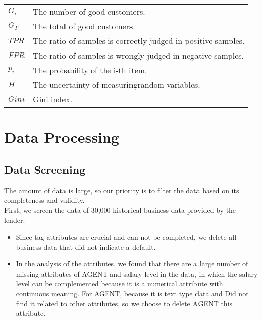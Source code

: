 \documentclass{mcmthesis}
\begin{document}
\begin{table}[htb]
\begin{tabular}{ll}
$G_i$ & The number of good customers. \\

$G_T$ & The total  of good customers. \\

$TPR$ & The ratio of samples is correctly judged in positive samples.\\

$FPR$ & The ratio of samples is wrongly judged in negative samples.\\

$p_i$ & The probability of the i-th item.\\

$H$ & The uncertainty of measuringrandom variables.\\

$Gini$ & Gini index. \\
\bottomrule
\end{tabular}
\end{table}

\section{Data Processing}
\subsection{Data Screening}
The amount of data is large, so our priority is to filter the data based on its completeness and validity.\\

First, we screen the data of 30,000 historical business data provided by the lender:\\
\begin{itemize}
\item Since tag attributes are crucial and can not be completed, we delete all business data that did not indicate a default.
\item In the analysis of the attributes, we found that there are a large number of missing attributes of AGENT and salary level in the data, in which the salary level can be complemented because it is a numerical attribute with continuous meaning. For AGENT, because it is text type data and Did not find it related to other attributes, so we choose to delete AGENT this attribute.
\end{itemize}
\end{document}
